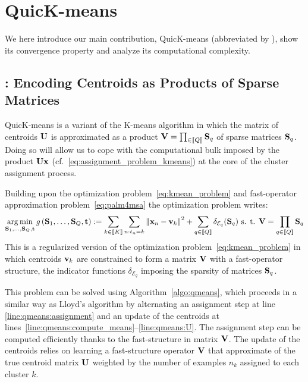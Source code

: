 
\section{QuicK-means}
\label{sec:contribution}

We here introduce our main contribution, QuicK-means (abbreviated by \qkmeans), 
show its convergence property and analyze its computational complexity.

\subsection{\qkmeans: Encoding Centroids as Products of Sparse Matrices}

QuicK-means is a variant of the K-means algorithm in which the matrix of centroids ${\mathbf{U}}$
is approximated as a product ${\mathbf{V}}=\prod_{\in\left \llbracket Q\right \rrbracket}{\mathbf{S}}_q$ of sparse matrices ${\mathbf{S}}_q$.
Doing so will allow us to cope with the computational bulk imposed by the product ${\mathbf{U}}{\mathbf{x}}$
(cf.~\eqref{eq:assignment_problem_kmeans}) at the core of the cluster assignment process.

Building upon the \kmeans optimization problem~\eqref{eq:kmean_problem} and fast-operator approximation problem~\eqref{eq:palm4msa} the \qkmeans optimization problem 
writes:
%
\begin{align}
\label{eq:qmean_problem}
 \operatorname*{arg\,min}_{{\mathbf{S}}_1, \ldots, {\mathbf{S}}_{Q}, {\mathbf{t}}} g\left({\mathbf{S}}_1, \ldots, {\mathbf{S}}_{Q}, {\mathbf{t}}\right)
    := \sum_{k\in\left \llbracket K\right \rrbracket}\sum_{n: t_n = k} \left\|{\mathbf{x}}_n -{\mathbf{v}}_k\right\|^2 + \sum_{q\in\left \llbracket Q\right \rrbracket} \delta_{\mathcal{E}_q}({\mathbf{S}}_q) \text{ s. t. } {\mathbf{V}} = \prod_{q\in\left \llbracket Q\right \rrbracket}{\mathbf{S}}_q
\end{align}
%
This is a regularized version of the \kmeans optimization problem~\eqref{eq:kmean_problem} in which centroids ${\mathbf{v}}_k$ are constrained to form a matrix ${\mathbf{V}}$ with a fast-operator structure, the indicator functions $\delta_{\mathcal{E}_q}$ imposing the sparsity of matrices ${\mathbf{S}}_q$.


This problem can be solved using Algorithm~\ref{algo:qmeans},
which proceeds in a similar way as Lloyd's algorithm by alternating an assignment step at line \ref{line:qmeans:assignment} and an update of the centroids at lines~\ref{line:qmeans:compute_means}--\ref{line:qmeans:U}. The assignment step can be computed efficiently thanks to the fast-structure in matrix ${\mathbf{V}}$. The update of the centroids relies on learning a fast-structure operator ${\mathbf{V}}$ that approximate of the true centroid matrix ${\mathbf{U}}$ weighted by the number of examples $n_k$ assigned to each cluster $k$.

